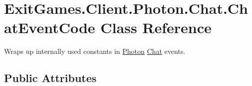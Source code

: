\hypertarget{class_exit_games_1_1_client_1_1_photon_1_1_chat_1_1_chat_event_code}{}\section{Exit\+Games.\+Client.\+Photon.\+Chat.\+Chat\+Event\+Code Class Reference}
\label{class_exit_games_1_1_client_1_1_photon_1_1_chat_1_1_chat_event_code}


Wraps up internally used constants in \hyperlink{namespace_exit_games_1_1_client_1_1_photon}{Photon} \hyperlink{namespace_exit_games_1_1_client_1_1_photon_1_1_chat}{Chat} events.  


\subsection*{Public Attributes}
